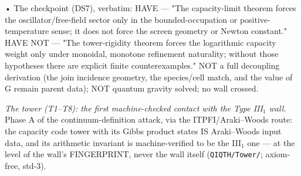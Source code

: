 \documentclass[11pt,a4paper]{article}
\begin{document}
  • The checkpoint (DS7), verbatim: HAVE — "The capacity-limit theorem forces the oscillator/free-field sector only in the bounded-occupation or positive-temperature sense; it does not force the screen geometry or Newton constant." HAVE NOT — "The tower-rigidity theorem forces the logarithmic capacity weight only under monoidal, monotone refinement naturality; without those hypotheses there are explicit finite counterexamples." NOT a full decoupling derivation (the join incidence geometry, the species/cell match, and the value of G remain parent data); NOT quantum gravity solved; no wall crossed.

\emph{The tower (T1--T8): the first machine-checked contact with the Type III$_1$ wall.} Phase A of the continuum-definition attack, via the ITPFI/Araki--Woods route: the capacity code tower with its Gibbs product states IS Araki--Woods input data, and its arithmetic invariant is machine-verified to be the III$_1$ one --- at the level of the wall's FINGERPRINT, never the wall itself (\texttt{QIQTH/Tower/}; axiom-free, std-3).
\end{document}
